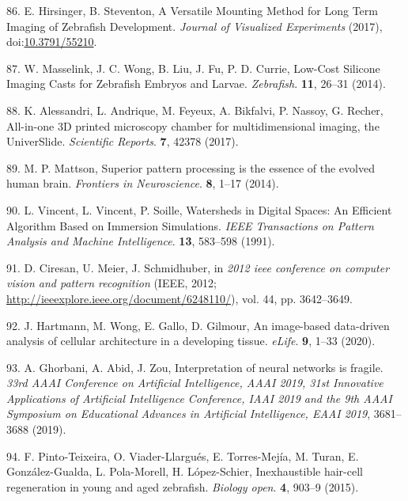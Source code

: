 \documentclass[11pt,singlespacinge,twoside]{reedthesis} %
\theoremstyle{definition}
\theoremstyle{definition}
\theoremstyle{definition}
\theoremstyle{remark}
\begin{document}
\leavevmode\hypertarget{ref-Hirsinger2017}{}%
86. E. Hirsinger, B. Steventon, A Versatile Mounting Method for Long Term Imaging of Zebrafish Development. \emph{Journal of Visualized Experiments} (2017), doi:\href{https://doi.org/10.3791/55210}{10.3791/55210}.

\leavevmode\hypertarget{ref-Masselink2014}{}%
87. W. Masselink, J. C. Wong, B. Liu, J. Fu, P. D. Currie, Low-Cost Silicone Imaging Casts for Zebrafish Embryos and Larvae. \emph{Zebrafish}. \textbf{11}, 26--31 (2014).

\leavevmode\hypertarget{ref-Alessandri2017}{}%
88. K. Alessandri, L. Andrique, M. Feyeux, A. Bikfalvi, P. Nassoy, G. Recher, All-in-one 3D printed microscopy chamber for multidimensional imaging, the UniverSlide. \emph{Scientific Reports}. \textbf{7}, 42378 (2017).

\leavevmode\hypertarget{ref-Mattson2014}{}%
89. M. P. Mattson, Superior pattern processing is the essence of the evolved human brain. \emph{Frontiers in Neuroscience}. \textbf{8}, 1--17 (2014).

\leavevmode\hypertarget{ref-Vincent1991}{}%
90. L. Vincent, L. Vincent, P. Soille, Watersheds in Digital Spaces: An Efficient Algorithm Based on Immersion Simulations. \emph{IEEE Transactions on Pattern Analysis and Machine Intelligence}. \textbf{13}, 583--598 (1991).

\leavevmode\hypertarget{ref-Ueda1993}{}%
91. D. Ciresan, U. Meier, J. Schmidhuber, in \emph{2012 ieee conference on computer vision and pattern recognition} (IEEE, 2012; \url{http://ieeexplore.ieee.org/document/6248110/}), vol. 44, pp. 3642--3649.

\leavevmode\hypertarget{ref-Hartmann2020}{}%
92. J. Hartmann, M. Wong, E. Gallo, D. Gilmour, An image-based data-driven analysis of cellular architecture in a developing tissue. \emph{eLife}. \textbf{9}, 1--33 (2020).

\leavevmode\hypertarget{ref-Ghorbani2019}{}%
93. A. Ghorbani, A. Abid, J. Zou, Interpretation of neural networks is fragile. \emph{33rd AAAI Conference on Artificial Intelligence, AAAI 2019, 31st Innovative Applications of Artificial Intelligence Conference, IAAI 2019 and the 9th AAAI Symposium on Educational Advances in Artificial Intelligence, EAAI 2019}, 3681--3688 (2019).

\leavevmode\hypertarget{ref-Pinto-Teixeira2015}{}%
94. F. Pinto-Teixeira, O. Viader-Llargués, E. Torres-Mejía, M. Turan, E. González-Gualda, L. Pola-Morell, H. López-Schier, Inexhaustible hair-cell regeneration in young and aged zebrafish. \emph{Biology open}. \textbf{4}, 903--9 (2015).
\end{document}
